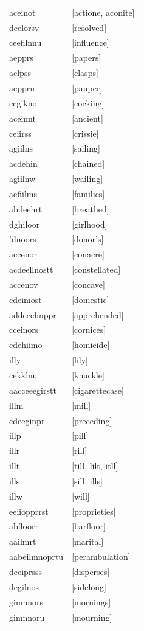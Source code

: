 \documentclass{article}
\begin{document}
\begin{tabular}{ll}
aceinot & [actione, aconite] \\
deelorsv & [resolved] \\
ceefilnnu & [influence] \\
aepprs & [papers] \\
aclpss & [clasps] \\
aeppru & [pauper] \\
ccgikno & [cocking] \\
aceinnt & [ancient] \\
ceiirss & [crissie] \\
agiilns & [sailing] \\
acdehin & [chained] \\
agiilnw & [wailing] \\
aefiilms & [families] \\
abdeehrt & [breathed] \\
dghiloor & [girlhood] \\
'dnoors & [donor's] \\
accenor & [conacre] \\
acdeellnostt & [constellated] \\
accenov & [concave] \\
cdeimost & [domestic] \\
addeeehnppr & [apprehended] \\
cceinors & [cornices] \\
cdehiimo & [homicide] \\
illy & [lily] \\
cekklnu & [knuckle] \\
aacceeegirstt & [cigarettecase] \\
illm & [mill] \\
cdeeginpr & [preceding] \\
illp & [pill] \\
illr & [rill] \\
illt & [till, lilt, itll] \\
ills & [sill, ills] \\
illw & [will] \\
eeiiopprrst & [proprieties] \\
abfloorr & [barfloor] \\
aailmrt & [marital] \\
aabeilmnoprtu & [perambulation] \\
deeiprsss & [disperses] \\
degilnos & [sidelong] \\
gimnnors & [mornings] \\
gimnnoru & [mourning] \\

\end{tabular}
\end{document}
